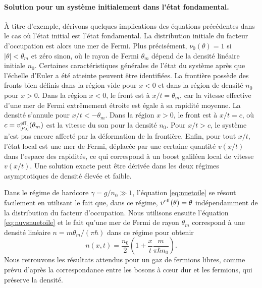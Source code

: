 \documentclass[submission, Phys]{SciPost}
\begin{document}
{\paragraph{Solution pour un système initialement dans l'état fondamental.}
À titre d'exemple, dérivons quelques implications des équations précédentes dans le cas où l'état initial est l'état fondamental. La distribution initiale du facteur d'occupation est alors une mer de Fermi. Plus précisément, $\nu_0(\theta)=1$ si $|\theta| < \theta_m$ et zéro sinon, où le rayon de Fermi $\theta_m$ dépend de la densité linéaire initiale $n_0$. 
Certaines caractéristiques générales de l'état du système après que l'échelle d'Euler a été atteinte peuvent être identifiées. La frontière possède des fronts bien définis dans la région vide pour $x<0$ et dans la région de densité
$n_0$ pour $x>0$. Dans la région $x<0$, le front est à 
$x/t =\theta_m$, car la vitesse effective d'une mer de Fermi extrêmement étroite est égale à sa rapidité moyenne. La densité s'annule pour $x/t<-\theta_m$. Dans la région $x>0$, le front est à $x/t = c$, où $c=v^{\rm eff}_{[\nu_0]}(\theta_m)$ est la vitesse du son pour la densité $n_0$. Pour $x/t>c$, le système n'est pas encore affecté par la déformation de la frontière. Enfin, pour tout $x/t$, l'état local est une mer de Fermi, déplacée par une certaine quantité $v(x/t)$ dans l'espace des rapidités, ce qui correspond à un boost galiléen local de vitesse $v(x/t)$.
Une solution exacte peut être dérivée dans les deux régimes asymptotiques de densité élevée et faible.

Dans le régime de hardcore $\gamma=g/n_0\gg 1$, l'équation \eqref{eq:nuetoile} se résout facilement en utilisant le fait que, dans ce régime, $v^{\rm eff} (\theta)=\theta$ indépendamment de la distribution du facteur d'occupation. Nous utilisons ensuite l'équation \eqref{eq:nuvsnuetoile} et le fait qu'une mer de Fermi de rayon $\theta_m$ correspond à une densité linéaire $n=m\theta_m/(\pi\hbar)$ dans ce régime pour obtenir 
\begin{equation}
    n(x,t)=\frac{n_0}{2} \left ( 1 + \frac{x}{t} \frac{m}{\pi \hbar n_0} \right ).
\end{equation}
Nous retrouvons les résultats attendus pour un gaz de fermions libres, comme prévu d'après la correspondance entre les bosons à cœur dur et les fermions, qui préserve la densité\cite{girardeau_relationship_1960}.

}
\end{document}
